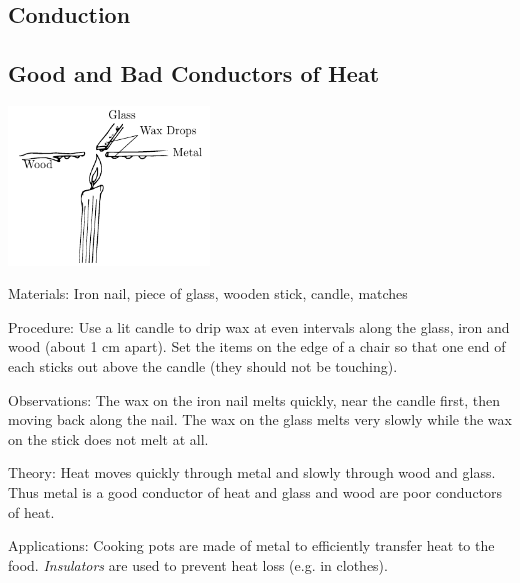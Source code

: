 \begin{multicols}{2}
\section*{Conduction}


\subsection{Good and Bad Conductors of Heat}

\begin{center}
\includegraphics[width=0.4\textwidth]{./img/heat-conduction.png}
\end{center}

\begin{description*}
\item[Materials:]{Iron nail, piece of glass, wooden stick, candle, matches}
\item[Procedure:]{Use a lit candle to drip wax at even intervals along the glass, iron and wood (about 1 cm apart). Set the items on the edge of a chair so that one end of each sticks out above the candle (they should not be touching).}
\item[Observations:]{The wax on the iron nail melts quickly, near the candle first, then moving back along the nail. The wax on the glass melts very slowly while the wax on the stick does not melt at all.}
\item[Theory:]{Heat moves quickly through metal and slowly through wood and glass. Thus metal is a good conductor of heat and glass and wood are poor conductors of heat.}
\item[Applications:]{Cooking pots are made of metal to efficiently transfer heat to the food. \emph{Insulators} are used to prevent heat loss (e.g. in clothes).}
\end{description*}


\end{multicols}
